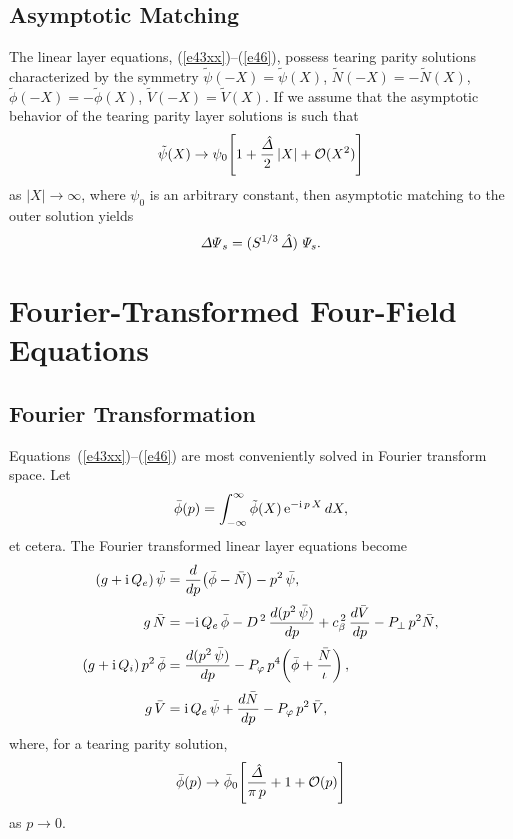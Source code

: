 \documentclass[12pt,prb,aps]{revtex4-1}
\begin{document}
\subsection{Asymptotic Matching}
The  linear layer equations, (\ref{e43xx})--(\ref{e46}), possess tearing parity solutions
characterized by the symmetry $\tilde{\psi}(-X)=\tilde\psi(X)$, 
$\tilde{N}(-X)= - \tilde{N}(X)$, $\tilde{\phi}(-X)=-\tilde{\phi}(X)$,  $\tilde{V}(-X)=\tilde{V}(X)$. If we assume that
the asymptotic behavior of the tearing parity layer solutions is such that 
\begin{equation}\label{e47}
\tilde{\psi}(X)\rightarrow  \psi_0\!\left[1+ \frac{\hat{\mit\Delta}}{2}\,|X| + {\cal O}(X^2)\right]
\end{equation}
as $|X|\rightarrow\infty$, where $\psi_0$ is an arbitrary constant, then asymptotic matching to the outer solution yields
\begin{equation}\label{e48}
{\mit\Delta\Psi}_s= (S^{1/3}\,\hat{\mit\Delta})\,\,{\mit\Psi}_s.
\end{equation}

\section{Fourier-Transformed Four-Field Equations}\label{linear}
\subsection{Fourier Transformation}
Equations~(\ref{e43xx})--(\ref{e46}) are most conveniently solved in Fourier transform space.\cite{cole} 
Let
\begin{equation}
\bar{\phi}(p) = \int_{-\infty}^\infty \tilde{\phi}(X)\,{\rm e}^{-{\rm i}\,p\,X}\,dX,
\end{equation}
et cetera. The Fourier transformed linear layer equations become
\begin{align}\label{e314}
(g+{\rm i}\,Q_e)\,\bar{\psi}&=\frac{d}{dp}\!\left(\bar{\phi}-\bar{N}\right)-p^2\,\bar{\psi},\\[0.5ex]
g\,\bar{N} &= - {\rm i}\,Q_{e}\,\bar{\phi} -D^{\,2}\,\frac{d(p^2\,\bar{\psi})}{dp}+ c_\beta^{\,2}\,\frac{d\bar{V}}{dp}
  - P_\perp\,p^2\bar{N},\label{e316}\\[0.5ex]
(g+{\rm i}\,Q_i)\,p^2\,\bar{\phi}&=  \frac{d(p^2\,\bar{\psi})}{dp}- P_\varphi\,p^4\!\left(\bar{\phi} + \frac{\bar{N}}{\iota}\right),\\[0.5ex]
g\,\bar{V} &= {\rm i}\,Q_{e}\,\bar{\psi} +\frac{d\bar{N}}{dp}- P_\varphi\,p^2\,\bar{V},\label{e317}
\end{align}
where, for a tearing parity solution, 
\begin{equation}\label{e41}
\bar{\phi}(p)\rightarrow \bar{\phi}_0\!\left[\frac{\hat{\mit\Delta}}{\pi\,p} + 1+ {\cal O}(p)\right]
\end{equation}
as $p\rightarrow 0$. 
\end{document}
